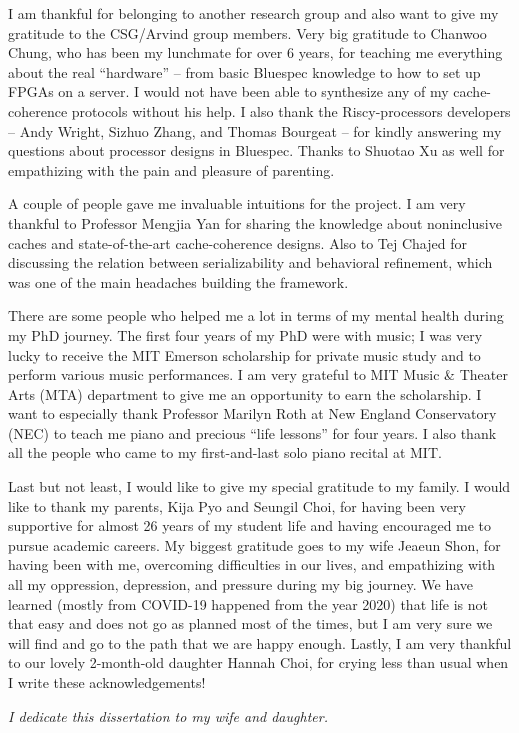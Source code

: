 I am thankful for belonging to another research group and also want to give my gratitude to the CSG/Arvind group members.
Very big gratitude to Chanwoo Chung, who has been my lunchmate for over 6 years, for teaching me everything about the real ``hardware'' -- from basic Bluespec knowledge to how to set up FPGAs on a server.
I would not have been able to synthesize any of my \hemiola{} cache-coherence protocols without his help.
I also thank the Riscy-processors developers -- Andy Wright, Sizhuo Zhang, and Thomas Bourgeat -- for kindly answering my questions about processor designs in Bluespec.
Thanks to Shuotao Xu as well for empathizing with the pain and pleasure of parenting.

A couple of people gave me invaluable intuitions for the \hemiola{} project.
I am very thankful to Professor Mengjia Yan for sharing the knowledge about noninclusive caches and state-of-the-art cache-coherence designs.
Also to Tej Chajed for discussing the relation between serializability and behavioral refinement, which was one of the main headaches building the framework.

There are some people who helped me a lot in terms of my mental health during my PhD journey.
The first four years of my PhD were with music; I was very lucky to receive the MIT Emerson scholarship for private music study and to perform various music performances.
I am very grateful to MIT Music \& Theater Arts (MTA) department to give me an opportunity to earn the scholarship.
I want to especially thank Professor Marilyn Roth at New England Conservatory (NEC) to teach me piano and precious ``life lessons'' for four years.
I also thank all the people who came to my first-and-last solo piano recital at MIT.

Last but not least, I would like to give my special gratitude to my family.
I would like to thank my parents, Kija Pyo and Seungil Choi, for having been very supportive for almost 26 years of my student life and having encouraged me to pursue academic careers.
My biggest gratitude goes to my wife Jeaeun Shon, for having been with me, overcoming difficulties in our lives, and empathizing with all my oppression, depression, and pressure during my big journey.
We have learned (mostly from COVID-19 happened from the year 2020) that life is not that easy and does not go as planned most of the times, but I am very sure we will find and go to the path that we are happy enough.
Lastly, I am very thankful to our lovely 2-month-old daughter Hannah Choi, for crying less than usual when I write these acknowledgements!

\emph{I dedicate this dissertation to my wife and daughter.}
